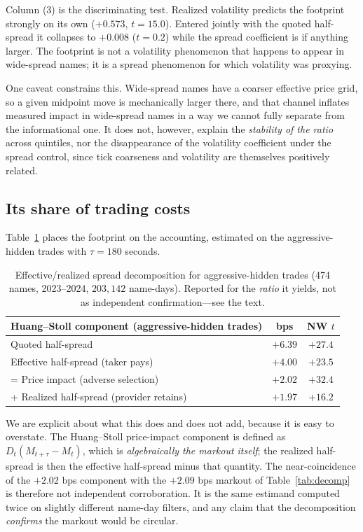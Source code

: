 \documentclass[11pt]{article}
\begin{document}
Column (3) is the discriminating test. Realized volatility predicts the footprint strongly
on its own ($+0.573$, $t=15.0$). Entered jointly with the quoted half-spread it collapses to
$+0.008$ ($t=0.2$) while the spread coefficient is if anything larger. The footprint is not
a volatility phenomenon that happens to appear in wide-spread names; it is a spread
phenomenon for which volatility was proxying.

One caveat constrains this. Wide-spread names have a coarser effective price grid, so a
given midpoint move is mechanically larger there, and that channel inflates measured impact
in wide-spread names in a way we cannot fully separate from the informational one. It does
not, however, explain the \emph{stability of the ratio} across quintiles, nor the
disappearance of the volatility coefficient under the spread control, since tick coarseness
and volatility are themselves positively related.

\subsection{Its share of trading costs}

Table~\ref{tab:spread} places the footprint on the \citet{huangstoll1997} accounting,
estimated on the aggressive-hidden trades with $\tau = 180$ seconds.

\begin{table}[htbp]
\centering
\begin{tabular}{lcc}
\toprule
\textbf{Huang--Stoll component (aggressive-hidden trades)} & \textbf{bps} & \textbf{NW $t$} \\
\midrule
Quoted half-spread & $+6.39$ & $+27.4$ \\
Effective half-spread (taker pays) & $+4.00$ & $+23.5$ \\
\quad = Price impact (adverse selection) & $+2.02$ & $+32.4$ \\
\quad + Realized half-spread (provider retains) & $+1.97$ & $+16.2$ \\
\bottomrule
\end{tabular}
\caption{Effective/realized spread decomposition \citep{huangstoll1997} for
aggressive-hidden trades (474 names, 2023--2024, $203{,}142$ name-days). Reported for the
\emph{ratio} it yields, not as independent confirmation---see the text.}
\label{tab:spread}
\end{table}

We are explicit about what this does and does not add, because it is easy to overstate. The
Huang--Stoll price-impact component is defined as $D_t(M_{t+\tau} - M_t)$, which is
\emph{algebraically the markout itself}; the realized half-spread is then the effective
half-spread minus that quantity. The near-coincidence of the $+2.02$ bps component with the
$+2.09$ bps markout of Table~\ref{tab:decomp} is therefore not independent corroboration.
It is the same estimand computed twice on slightly different name-day filters, and any
claim that the decomposition \emph{confirms} the markout would be circular.
\end{document}
